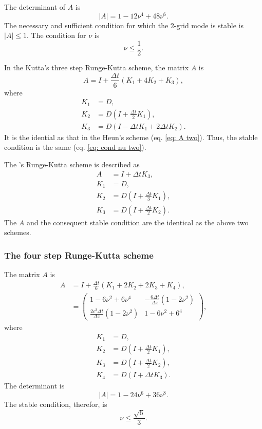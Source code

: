 The determinant of $A$ is
\begin{equation}
  |A| = 1 - 12\nu^4 + 48\nu^6. \label{eq: det two}
\end{equation}
The necessary and sufficient condition for which the 2-grid mode is stable is $|A| \leq 1$.
The condition for $\nu$ is
\begin{equation}
  \nu \leq \frac{1}{2}. \label{eq: cond nu two}
\end{equation}

In the Kutta's three step Runge-Kutta scheme, the matrix $A$ is
\begin{equation}
  A = I + \frac{\Delta t}{6}(K_1 + 4K_2 + K_3),
\end{equation}
where
\begin{align}
  K_1 &= D, \\
  K_2 &= D \left(I + \frac{\Delta t}{2}K_1\right), \\
  K_3 &= D \left(I - \Delta t K_1 + 2\Delta t K_2\right).
\end{align}
It is the idential as that in the Heun's scheme (eq. \ref{eq: A two}).
Thus, the stable condition is the same (eq. \ref{eq: cond nu two}).

The \citet{Wicker_Skamarock_2002}'s Runge-Kutta scheme is described as
\begin{align}
  A &= I + \Delta t K_3, \\
  K_1 &= D, \\
  K_2 &= D \left(I + \frac{\Delta t}{3}K_1\right), \\
  K_3 &= D \left(I + \frac{\Delta t}{2}K_2\right).
\end{align}
The $A$ and the consequent stable condition are the identical as the above two schemes.


\subsubsection{The four step Runge-Kutta scheme}
The matrix $A$ is
\begin{align}
  A &= I + \frac{\Delta t}{6}(K_1 + 2K_2 + 2K_3 + K_4), \\
  &= \begin{pmatrix}
    1-6\nu^2+6\nu^4 & -\frac{6\Delta t}{\Delta x}(1-2\nu^2) \\
    \frac{2c^2\Delta t}{\Delta x}(1-2\nu^2) & 1-6\nu^2+6^4
  \end{pmatrix},
\end{align}
where
\begin{align}
  K_1 &= D, \\
  K_2 &= D \left(I + \frac{\Delta t}{2}K_1\right), \\
  K_3 &= D \left(I + \frac{\Delta t}{2}K_2\right), \\
  K_4 &= D (I + \Delta t K_3).
\end{align}
The determinant is
\begin{equation}
  |A| = 1-24\nu^6+36\nu^8.
\end{equation}
The stable condition, therefor, is
\begin{equation}
  \nu \leq \frac{\sqrt{6}}{3}.
\end{equation}


